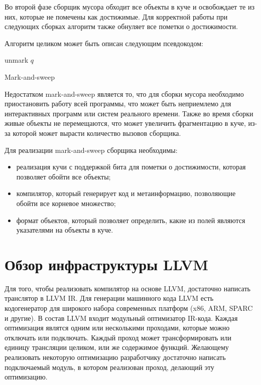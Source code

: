 Во второй фазе сборщик мусора обходит все объекты в куче и освобождает те из них, которые не помечены как достижимые. Для корректной работы при следующих сборках алгоритм также обнуляет все пометки о достижимости. 

Алгоритм целиком может быть описан следующим псевдокодом: 
\begin{algorithm}
\begin{algorithmic}[1]

    \State {}
  \EndFor
  \State {}
\EndFunction

    \State \Return
  \EndIf
    \State {}
  \EndFor
\EndFunction

    \Else
        \State unmark $q$
    \EndIf
  \EndFor
\EndFunction

\end{algorithmic}
\caption{Mark-and-sweep}
\end{algorithm}

Недостатком mark-and-sweep является то, что для сборки мусора необходимо приостановить работу всей программы, что может быть неприемлемо для интерактивных программ или систем реального времени. Также во время сборки живые объекты не перемещаются, что может увеличить фрагментацию в куче, из-за которой может вырасти количество вызовов сборщика. 

Для реализации mark-and-sweep сборщика необходимы:
\begin{itemize}
  \item реализация кучи с поддержкой бита для пометки о достижимости, которая позволяет обойти все объекты;
  \item компилятор, который генерирует код и метаинформацию, позволяющие обойти все корневое множество;
  \item формат объектов, который позволяет определить, какие из полей являются указателями на объекты в куче.
\end{itemize}

\section{Обзор инфраструктуры LLVM}
Для того, чтобы реализовать компилятор на основе LLVM, достаточно написать транслятор в LLVM IR. Для генерации машинного кода LLVM есть кодогенератор для широкого набора современных платформ (x86, ARM, SPARC и другие). В состав LLVM входит модульный оптимизатор IR-кода. Каждая оптимизация являтся одним или несколькими проходами, которые можно отключать или подключать. Каждый проход может трансформировать или единицу трансляции целиком, или же содержимое функций. Желающему реализовать некоторую оптимизацию разработчику достаточно написать подключаемый модуль, в котором реализован проход, делающий эту оптимизацию. 

